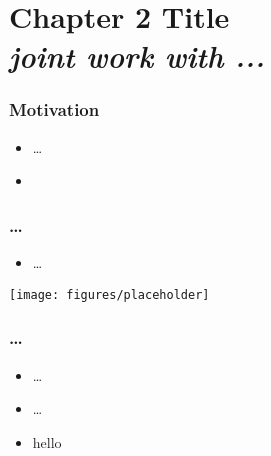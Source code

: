 
\section{Chapter 2 Title\\ \textit{\textmd{joint work with ...}}}
\label{chapter2}

\begin{frame}[t]\frametitle{Motivation}
    \begin{itemize}[<+->]
        \item \ldots
        \item \cite{Abbring2007}
    \end{itemize}
    \vfill
    \hyperlink{backup_2}{}
\end{frame}

\begin{frame}\frametitle{\ldots}
    \begin{itemize}
        \item \ldots
    \end{itemize}
    \begin{center}
        \texttt{[image: figures/placeholder]}
    \end{center}
\end{frame}

\begin{frame}[t]
    \frametitle{\ldots}
    \begin{itemize}
        \item<1-> \ldots
        \item<2->[$\Rightarrow$] \ldots \vspace{1em}
        \item<3-> hello 
    \end{itemize}
\end{frame}
